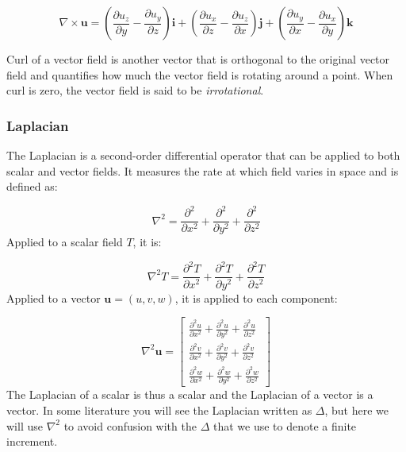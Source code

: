 \documentclass[12pt]{article}
\numberwithin{equation}{section}
\numberwithin{figure}{section}
\numberwithin{table}{section}
\begin{document}
\begin{equation}
  \nabla \times \mathbf{u} = \left( \frac{\partial u_z}{\partial y} -
    \frac{\partial u_y}{\partial z} \right) \mathbf{i} +
    \left( \frac{\partial u_x}{\partial z} -
    \frac{\partial u_z}{\partial x} \right) \mathbf{j} +
    \left( \frac{\partial u_y}{\partial x} -
    \frac{\partial u_x}{\partial y} \right) \mathbf{k}
  \label{eq:curl}
\end{equation}

Curl of a vector field is another vector that is orthogonal to the original
vector field and quantifies how much the vector field is rotating around a
point.
When curl is zero, the vector field is said to be \textit{irrotational}.

\subsubsection{Laplacian}

The Laplacian is a second-order differential operator that
can be applied to both scalar and vector fields.
It measures the rate at which field varies in space and is defined as:

\begin{equation}
  \nabla^2 = \frac{\partial^2}{\partial x^2} + \frac{\partial^2}{\partial y^2} + \frac{\partial^2}{\partial z^2}
  \label{eq:laplacian}
\end{equation}
Applied to a scalar field $T$, it is:

\begin{equation}
  \nabla^2 T = \frac{\partial^2 T}{\partial x^2} + \frac{\partial^2 T}{\partial y^2} + \frac{\partial^2 T}{\partial z^2}
\end{equation}
Applied to a vector $\mathbf{u} = (u, v, w)$, it is applied to each component:

\begin{equation}
  \nabla^2 \mathbf{u} = \begin{bmatrix}
    \frac{\partial^2 u}{\partial x^2} + \frac{\partial^2 u}{\partial y^2} + \frac{\partial^2 u}{\partial z^2} \\
    \frac{\partial^2 v}{\partial x^2} + \frac{\partial^2 v}{\partial y^2} + \frac{\partial^2 v}{\partial z^2} \\
    \frac{\partial^2 w}{\partial x^2} + \frac{\partial^2 w}{\partial y^2} + \frac{\partial^2 w}{\partial z^2}
  \end{bmatrix}
\end{equation}
The Laplacian of a scalar is thus a scalar and the Laplacian of a vector is a
vector.
In some literature you will see the Laplacian written as $\Delta$, but here we
will use $\nabla^2$ to avoid confusion with the $\Delta$ that we use to denote
a finite increment.
\end{document}
